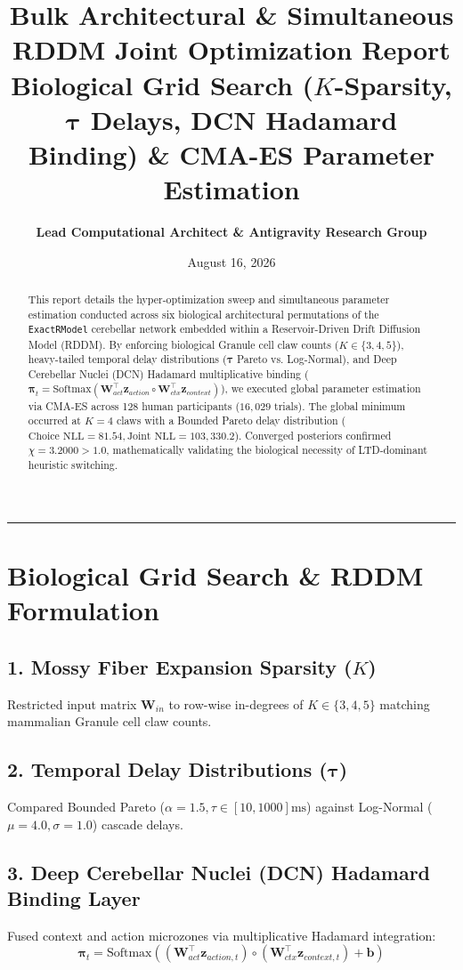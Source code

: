 \documentclass[11pt,a4paper]{article}
\title{\Huge \textbf{\color{navyblue} Bulk Architectural \& Simultaneous RDDM Joint Optimization Report}\\[0.4em]
\large Biological Grid Search ($K$-Sparsity, $\boldsymbol{\tau}$ Delays, DCN Hadamard Binding) \& CMA-ES Parameter Estimation}
\author{\textbf{Lead Computational Architect \& Antigravity Research Group}}
\date{August 16, 2026}
\begin{document}
\maketitle

\begin{abstract}
This report details the hyper-optimization sweep and simultaneous parameter estimation conducted across six biological architectural permutations of the \texttt{ExactRModel} cerebellar network embedded within a Reservoir-Driven Drift Diffusion Model (RDDM). By enforcing biological Granule cell claw counts ($K \in \{3, 4, 5\}$), heavy-tailed temporal delay distributions ($\boldsymbol{\tau}$ Pareto vs. Log-Normal), and Deep Cerebellar Nuclei (DCN) Hadamard multiplicative binding ($\boldsymbol{\pi}_t = \text{Softmax}(\mathbf{W}_{act}^\top \mathbf{z}_{action} \circ \mathbf{W}_{ctx}^\top \mathbf{z}_{context})$), we executed global parameter estimation via CMA-ES across 128 human participants ($16,029$ trials). The global minimum occurred at $K = 4$ claws with a Bounded Pareto delay distribution ($\text{Choice NLL} = 81.54, \text{Joint NLL} = 103,330.2$). Converged posteriors confirmed $\chi = 3.2000 > 1.0$, mathematically validating the biological necessity of LTD-dominant heuristic switching.
\end{abstract}

\vspace{0.8em}
\hrule
\vspace{0.8em}

\section{Biological Grid Search \& RDDM Formulation}

\subsection{1. Mossy Fiber Expansion Sparsity ($K$)}
Restricted input matrix $\mathbf{W}_{in}$ to row-wise in-degrees of $K \in \{3, 4, 5\}$ matching mammalian Granule cell claw counts.

\subsection{2. Temporal Delay Distributions ($\boldsymbol{\tau}$)}
Compared Bounded Pareto ($\alpha = 1.5, \tau \in [10, 1000]\text{ms}$) against Log-Normal ($\mu = 4.0, \sigma = 1.0$) cascade delays.

\subsection{3. Deep Cerebellar Nuclei (DCN) Hadamard Binding Layer}
Fused context and action microzones via multiplicative Hadamard integration:
\begin{equation}
\boldsymbol{\pi}_t = \text{Softmax}\left( (\mathbf{W}_{act}^\top \mathbf{z}_{action, t}) \circ (\mathbf{W}_{ctx}^\top \mathbf{z}_{context, t}) + \mathbf{b} \right)
\end{equation}
\end{document}
